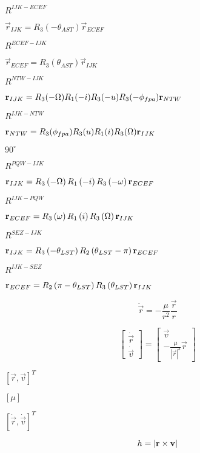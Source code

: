 \documentclass{article}
\begin{document}
$R^{IJK-ECEF}$
\pagebreak

$\vec{r}_{IJK} = R_{3}\left(-\theta_{AST}\right)\vec{r}_{ECEF}$
\pagebreak

$R^{ECEF-IJK}$
\pagebreak

$\vec{r}_{ECEF} = R_{3}\left(\theta_{AST}\right)\vec{r}_{IJK}$
\pagebreak

$R^{NTW-IJK}$
\pagebreak

${\bf r}_{IJK} = R_{3}(-\Omega)R_{1}(-i)R_{3}(-u)R_{3}(-\phi_{fpa}){\bf r}_{NTW}$
\pagebreak

$R^{IJK-NTW}$
\pagebreak

${\bf r}_{NTW} = R_{3}(\phi_{fpa})R_{3}(u)R_{1}(i)R_{3}(\Omega){\bf r}_{IJK}$
\pagebreak

$90^{\circ}$
\pagebreak

$R^{PQW-IJK}$
\pagebreak

${\bf r}_{IJK} = R_{3}\left(-\Omega\right)R_{1}\left(-i\right)R_{3}\left(-\omega\right){\bf r}_{ECEF}$
\pagebreak

$R^{IJK-PQW}$
\pagebreak

${\bf r}_{ECEF} = R_{3}\left(\omega\right)R_{1}\left(i\right)R_{3}\left(\Omega\right){\bf r}_{IJK}$
\pagebreak

$R^{SEZ-IJK}$
\pagebreak

${\bf r}_{IJK} = R_{3}\left(-\theta_{LST}\right)R_{2}\left(\theta_{LST}-\pi\right){\bf r}_{ECEF}$
\pagebreak

$R^{IJK-SEZ}$
\pagebreak

${\bf r}_{ECEF} = R_{2}\left(\pi-\theta_{LST}\right)R_{3}\left(\theta_{LST}\right){\bf r}_{IJK}$
\pagebreak

\[ \ddot{\vec{r}} = -\frac{\mu}{r^{2}}\frac{\vec{r}}{r}\]
\pagebreak

\[ \begin{bmatrix} \dot{\vec{r}}\\ \dot{\vec{v}} \end{bmatrix} = \begin{bmatrix} \vec{v}\\ -\frac{\mu}{\left|\vec{r}\right|^{3}}\vec{r} \end{bmatrix} \]
\pagebreak

$\left[\vec{r},\vec{v}\right]^{T}$
\pagebreak

$\left[\mu\right]$
\pagebreak

$\left[\dot{\vec{r}},\dot{\vec{v}}\right]^{T}$
\pagebreak

\[ {\bf} h = |{\bf r} \times {\bf v}| \]
\pagebreak
\end{document}

